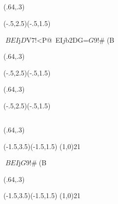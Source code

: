 \documentclass[a4j]{jarticle}
\begin{document}
\subsection{}
\begin{showEx}(.64,.3){}
\begin{pszahyou}[ul=10mm](-.5,2.5)(-.5,1.5)
  \Put{}
\end{pszahyou}
\end{showEx}

$BEI$j$D$V$7!$<P@~EI$j$b2DG=$G$9!#(B

\begin{showEx}(.64,.3){}
\begin{pszahyou}[ul=10mm](-.5,2.5)(-.5,1.5)
  \Put{}
\end{pszahyou}
\end{showEx}

\begin{showEx}(.64,.3){}
\begin{pszahyou}[ul=10mm](-.5,2.5)(-.5,1.5)
  \Put{}
  \Put{}
\end{pszahyou}
\end{showEx}

\subsection{}

\begin{showEx}(.64,.3){}
\begin{pszahyou}[ul=5mm](-1.5,3.5)(-1.5,1.5)
  \def\A{(1,0)}
  \Daen\A{2}{1}
\end{pszahyou}
\end{showEx}

$BEI$j$G$9!#(B

\begin{showEx}(.64,.3){}
\begin{pszahyou}[ul=5mm](-1.5,3.5)(-1.5,1.5)
  \def\A{(1,0)}
  \Daen*\A{2}{1}
\end{pszahyou}
\end{showEx}
\end{document}
